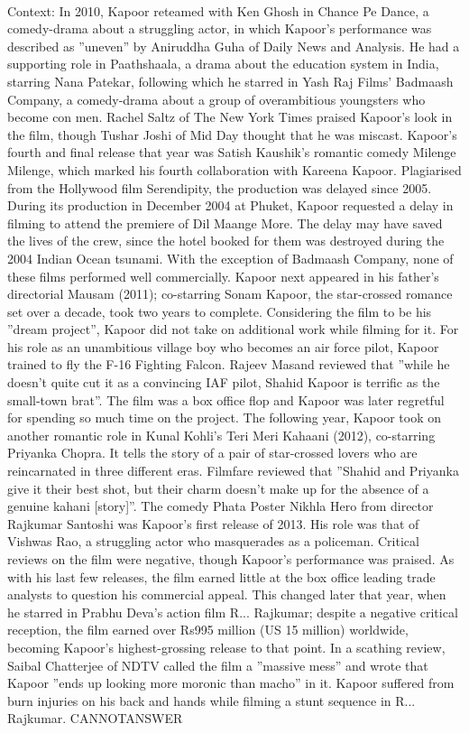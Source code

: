 \documentclass[11pt,a4paper, onecolumn]{article}
\begin{document}
\\ Context: In 2010, Kapoor reteamed with Ken Ghosh in Chance Pe Dance, a comedy-drama about a struggling actor, in which Kapoor's performance was described as ''uneven'' by Aniruddha Guha of Daily News and Analysis. He had a supporting role in Paathshaala, a drama about the education system in India, starring Nana Patekar, following which he starred in Yash Raj Films' Badmaash Company, a comedy-drama about a group of overambitious youngsters who become con men. Rachel Saltz of The New York Times praised Kapoor's look in the film, though Tushar Joshi of Mid Day thought that he was miscast. Kapoor's fourth and final release that year was Satish Kaushik's romantic comedy Milenge Milenge, which marked his fourth collaboration with Kareena Kapoor. Plagiarised from the Hollywood film Serendipity, the production was delayed since 2005. During its production in December 2004 at Phuket, Kapoor requested a delay in filming to attend the premiere of Dil Maange More. The delay may have saved the lives of the crew, since the hotel booked for them was destroyed during the 2004 Indian Ocean tsunami. With the exception of Badmaash Company, none of these films performed well commercially. Kapoor next appeared in his father's directorial Mausam (2011); co-starring Sonam Kapoor, the star-crossed romance set over a decade, took two years to complete. Considering the film to be his ''dream project'', Kapoor did not take on additional work while filming for it. For his role as an unambitious village boy who becomes an air force pilot, Kapoor trained to fly the F-16 Fighting Falcon. Rajeev Masand reviewed that ''while he doesn't quite cut it as a convincing IAF pilot, Shahid Kapoor is terrific as the small-town brat''. The film was a box office flop and Kapoor was later regretful for spending so much time on the project. The following year, Kapoor took on another romantic role in Kunal Kohli's Teri Meri Kahaani (2012), co-starring Priyanka Chopra. It tells the story of a pair of star-crossed lovers who are reincarnated in three different eras. Filmfare reviewed that ''Shahid and Priyanka give it their best shot, but their charm doesn't make up for the absence of a genuine kahani [story]''. The comedy Phata Poster Nikhla Hero from director Rajkumar Santoshi was Kapoor's first release of 2013. His role was that of Vishwas Rao, a struggling actor who masquerades as a policeman. Critical reviews on the film were negative, though Kapoor's performance was praised. As with his last few releases, the film earned little at the box office leading trade analysts to question his commercial appeal. This changed later that year, when he starred in Prabhu Deva's action film R... Rajkumar; despite a negative critical reception, the film earned over Rs995 million (US 15 million) worldwide, becoming Kapoor's highest-grossing release to that point. In a scathing review, Saibal Chatterjee of NDTV called the film a ''massive mess'' and wrote that Kapoor ''ends up looking more moronic than macho'' in it. Kapoor suffered from burn injuries on his back and hands while filming a stunt sequence in R... Rajkumar. CANNOTANSWER
\end{document}
